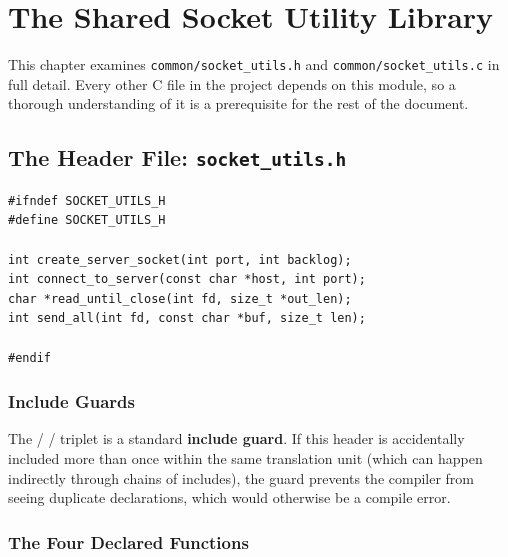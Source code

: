 \chapter{The Shared Socket Utility Library}
\label{chap:socket-utils}

This chapter examines \texttt{common/socket\_utils.h} and \texttt{common/socket\_utils.c} in full detail. Every other C file in the project depends on this module, so a thorough understanding of it is a prerequisite for the rest of the document.

\section{The Header File: \texttt{socket\_utils.h}}

\begin{lstlisting}[style=cstyle]
#ifndef SOCKET_UTILS_H
#define SOCKET_UTILS_H

int create_server_socket(int port, int backlog);
int connect_to_server(const char *host, int port);
char *read_until_close(int fd, size_t *out_len);
int send_all(int fd, const char *buf, size_t len);

#endif
\end{lstlisting}

\subsection{Include Guards}

The  /  /  triplet is a standard \textbf{include guard}. If this header is accidentally included more than once within the same translation unit (which can happen indirectly through chains of includes), the guard prevents the compiler from seeing duplicate declarations, which would otherwise be a compile error.

\subsection{The Four Declared Functions}

